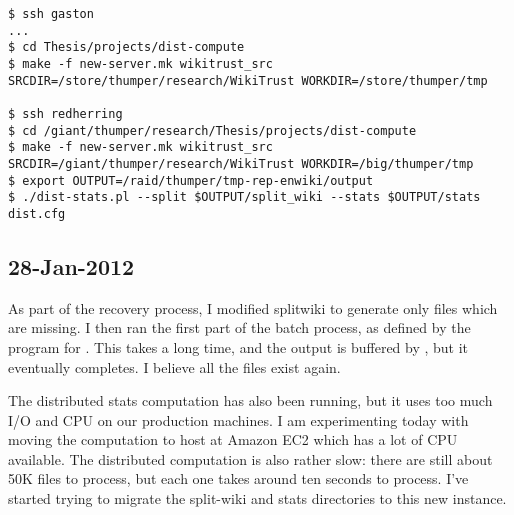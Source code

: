 \begin{verbatim}
$ ssh gaston
...
$ cd Thesis/projects/dist-compute
$ make -f new-server.mk wikitrust_src SRCDIR=/store/thumper/research/WikiTrust WORKDIR=/store/thumper/tmp

$ ssh redherring
$ cd /giant/thumper/research/Thesis/projects/dist-compute
$ make -f new-server.mk wikitrust_src SRCDIR=/giant/thumper/research/WikiTrust WORKDIR=/big/thumper/tmp
$ export OUTPUT=/raid/thumper/tmp-rep-enwiki/output
$ ./dist-stats.pl --split $OUTPUT/split_wiki --stats $OUTPUT/stats dist.cfg
\end{verbatim}

\subsection{28-Jan-2012}

As part of the recovery process, I modified splitwiki to generate only
files which are missing.
I then ran the first part of the batch process, as defined by the
 program for .
This takes a long time, and the output is buffered by
, but it eventually completes.
I believe all the files exist again.

The distributed stats computation has also been running, but it uses
too much I/O and CPU on our production machines.
I am experimenting today with moving the computation to host at
Amazon EC2 which has a lot of CPU available.
The distributed computation is also rather slow: there are still
about 50K files to process, but each one takes around ten seconds
to process.
I've started trying to migrate the split-wiki and stats directories
to this new instance.

